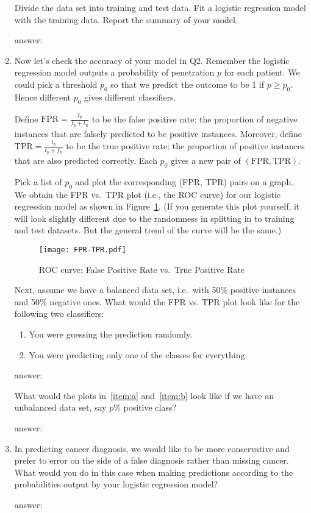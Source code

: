 \documentclass{article}
\newcommand{\answerbox}[1]{
	\begin{center}
		\ifdefined\printsol
			\begin{mdframed}
				\begin{minipage}{0.95\textwidth}
					{\color{blue} {#1}}
				\end{minipage}
			\end{mdframed}
		\else
			\begin{mdframed}
				\begin{minipage}{0.95\textwidth}
					\phantom{\parbox{\linewidth}{#1}}
				\end{minipage}
			\end{mdframed}
		\fi
		\end{center}
	}
\begin{document}
\begin{enumerate}
Divide the data set into training and test data. Fit a logistic regression model with the training data. Report the
summary of your model.

\answerbox{
  answer:
}

\item
  Now let's check the accuracy of your model in Q2. Remember the
  logistic regression model outputs a probability of penetration $p$ for
  each patient. We could pick a threshold $p_0$ so that we predict the
  outcome to be 1 if $p \ge p_0$. Hence different $p_0$ gives different
  classifiers.

  \bigskip

  Define $\mathrm{FPR} = \frac{f_p}{f_p + t_n}$ to be the false positive rate:
  the
proportion of negative instances that are falsely predicted to be
positive instances. Moreover, define $\mathrm{TPR} = \frac{t_p}{t_p+f_n}$ to be
the true positive rate:  the proportion of positive instances that are also
predicted correctly. Each
$p_0$ gives a new pair of $(\mathrm{FPR}, \mathrm{TPR})$.

\bigskip
Pick a list of $p_0$ and plot the corresponding (FPR, TPR) pairs on a
graph. We obtain the FPR vs.\ TPR plot (i.e., the ROC curve) for our logistic
regression model as shown in Figure~\ref{fig:fprtpr}. (If you generate this
plot yourself, it will look slightly different due to the randomness in
splitting in to training and test datasets. But the general trend of the curve
will be the same.)

\begin{figure}[ht]
	\centering
	\texttt{[image: FPR-TPR.pdf]}
	\caption{ROC curve: False Positive Rate vs.\ True Positive
	Rate\label{fig:fprtpr}}
\end{figure}

\bigskip
Next, assume we have a balanced data set, i.e.~with 50\% positive
instances and 50\% negative ones. What would the FPR vs. TPR plot look
like for the following two classifiers:

\begin{enumerate}
\def\labelenumi{\alph{enumi}.}
\item \label{item:a}
You were guessing the prediction randomly.
\item \label{item:b}
You were predicting only one of the classes for everything.
\end{enumerate}


\answerbox{
answer:
}

What would the plots in~\ref{item:a} and~\ref{item:b} look like if we have an
unbalanced data set, say $p\%$ positive class?

\answerbox{
  answer:
}
\item
  In predicting cancer diagnosis, we would like to be more conservative
  and prefer to error on the side of a false diagnosis rather than
  missing cancer. What would you do in this case when making predictions
  according to the probabilities output by your logistic regression
  model?

\answerbox{
answer:
}

\end{enumerate}
\end{document}
